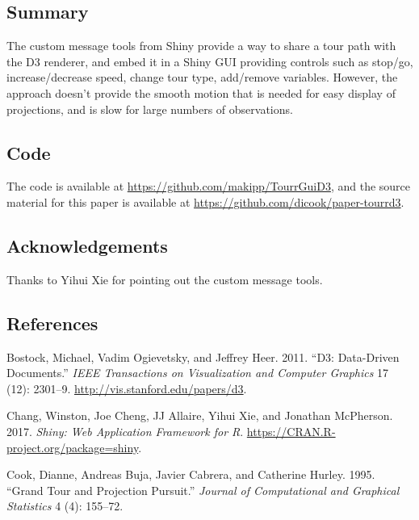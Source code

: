 \hypertarget{summary}{%
\subsection{Summary}\label{summary}}

The custom message tools from Shiny provide a way to share a tour path
with the D3 renderer, and embed it in a Shiny GUI providing controls
such as stop/go, increase/decrease speed, change tour type, add/remove
variables. However, the approach doesn't provide the smooth motion that
is needed for easy display of projections, and is slow for large numbers
of observations.

\hypertarget{code}{%
\subsection{Code}\label{code}}

The code is available at \url{https://github.com/makipp/TourrGuiD3}, and
the source material for this paper is available at
\url{https://github.com/dicook/paper-tourrd3}.

\hypertarget{acknowledgements}{%
\subsection{Acknowledgements}\label{acknowledgements}}

Thanks to Yihui Xie for pointing out the custom message tools.

\hypertarget{references}{%
\subsection{References}\label{references}}

\hypertarget{refs}{}
\leavevmode\hypertarget{ref-D3}{}%
Bostock, Michael, Vadim Ogievetsky, and Jeffrey Heer. 2011. ``D3:
Data-Driven Documents.'' \emph{IEEE Transactions on Visualization and
Computer Graphics} 17 (12): 2301--9.
\url{http://vis.stanford.edu/papers/d3}.

\leavevmode\hypertarget{ref-shiny}{}%
Chang, Winston, Joe Cheng, JJ Allaire, Yihui Xie, and Jonathan
McPherson. 2017. \emph{Shiny: Web Application Framework for R}.
\url{https://CRAN.R-project.org/package=shiny}.

\leavevmode\hypertarget{ref-gt_pp}{}%
Cook, Dianne, Andreas Buja, Javier Cabrera, and Catherine Hurley. 1995.
``Grand Tour and Projection Pursuit.'' \emph{Journal of Computational
and Graphical Statistics} 4 (4): 155--72.


